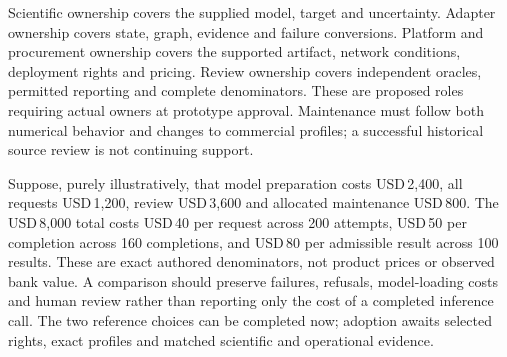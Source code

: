 Scientific ownership covers the supplied model, target and uncertainty.
Adapter ownership covers state, graph, evidence and failure conversions.
Platform and procurement ownership covers the supported artifact, network
conditions, deployment rights and pricing. Review ownership covers
independent oracles, permitted reporting and complete denominators. These
are proposed roles requiring actual owners at prototype approval.
Maintenance must follow both numerical behavior and changes to commercial
profiles; a successful historical source review is not continuing support.
\citep{exec25_bn_commercial_choice}

Suppose, purely illustratively, that model preparation costs USD\,2,400,
all requests USD\,1,200, review USD\,3,600 and allocated maintenance
USD\,800. The USD\,8,000 total costs USD\,40 per request across 200
attempts, USD\,50 per completion across 160 completions, and USD\,80
per admissible result across 100 results. These are exact authored
denominators, not product prices or observed bank value. A comparison
should preserve failures, refusals, model-loading costs and human review
rather than reporting only the cost of a completed inference call. The
two reference choices can be completed now; adoption awaits selected
rights, exact profiles and matched scientific and operational evidence.
\citep{exec25_bn_commercial_choice}
\label{sec:exec25-bn-commercial-reuse-end}
